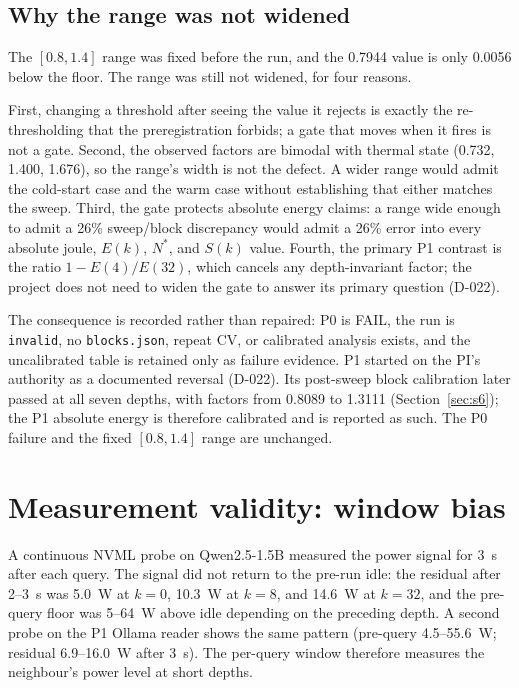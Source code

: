 \documentclass[a4paper,fleqn]{cas-sc}
\begin{document}
\subsection{Why the range was not widened}

The $[0.8,1.4]$ range was fixed before the run, and the 0.7944 value is only 0.0056 below the
floor. The range was still not widened, for four reasons.

First, changing a threshold after seeing the value it rejects is exactly the re-thresholding
that the preregistration forbids; a gate that moves when it fires is not a gate. Second, the
observed factors are bimodal with thermal state (0.732, 1.400, 1.676), so the range's width is
not the defect. A wider range would admit the cold-start case and the warm case without
establishing that either matches the sweep. Third, the gate protects absolute energy claims: a
range wide enough to admit a 26\% sweep/block discrepancy would admit a 26\% error into every
absolute joule, $E(k)$, $N^{*}$, and $S(k)$ value. Fourth, the primary P1 contrast is the ratio
$1-E(4)/E(32)$, which cancels any depth-invariant factor; the project does not need to widen
the gate to answer its primary question (D-022).

The consequence is recorded rather than repaired: P0 is FAIL, the run is \texttt{invalid}, no
\texttt{blocks.json}, repeat CV, or calibrated analysis exists, and the uncalibrated table is
retained only as failure evidence. P1 started on the PI's authority as a documented reversal
(D-022). Its post-sweep block calibration later passed at all seven depths, with factors from
0.8089 to 1.3111 (Section~\ref{sec:s6}); the P1 absolute energy is therefore calibrated and is
reported as such. The P0 failure and the fixed $[0.8,1.4]$ range are unchanged.

\section{Measurement validity: window bias}\label{sec:s5b}

A continuous NVML probe on Qwen2.5-1.5B measured the power signal for 3~s after
each query. The signal did not return to the pre-run idle: the residual after
2--3~s was 5.0~W at $k=0$, 10.3~W at $k=8$, and 14.6~W at $k=32$, and the
pre-query floor was 5--64~W above idle depending on the preceding depth. A
second probe on the P1 Ollama reader shows the same pattern (pre-query
4.5--55.6~W; residual 6.9--16.0~W after 3~s). The per-query window therefore
measures the neighbour's power level at short depths.
\end{document}
